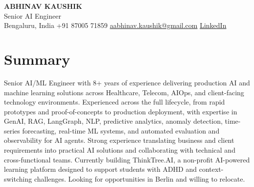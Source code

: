 \documentclass[10pt,a4paper]{article}
\begin{document}
\begin{center}
  {\LARGE\bfseries ABHINAV KAUSHIK}\\[2pt]
  {\large Senior AI Engineer}\\[2pt]
  Bengaluru, India \textbar{} +91 87005 71859 \textbar{} \href{mailto:aabhinav.kaushik@gmail.com}{aabhinav.kaushik@gmail.com} \textbar{} \href{https://www.linkedin.com/in/abhinav-kaushik10/}{LinkedIn}  
\end{center}

\section{Summary}
Senior AI/ML Engineer with 8+ years of experience delivering production AI and machine learning solutions across Healthcare, Telecom, AIOps, and client-facing technology environments. Experienced across the full lifecycle, from rapid prototypes and proof-of-concepts to production deployment, with expertise in GenAI, RAG, LangGraph, NLP, predictive analytics, anomaly detection, time-series forecasting, real-time ML systems, and automated evaluation and observability for AI agents. Strong experience translating business and client requirements into practical AI solutions and collaborating with technical and cross-functional teams. Currently building ThinkTree.AI, a non-profit AI-powered learning platform designed to support students with ADHD and context-switching challenges. Looking for opportunities in Berlin and willing to relocate.
\end{document}
